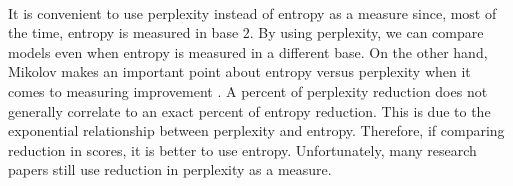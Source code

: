 \paragraph{}
It is convenient to use perplexity instead of entropy as a measure since, most of the time, entropy is measured in base $2$. By using perplexity, we can compare models even when entropy is measured in a different base. On the other hand, Mikolov makes an important point about entropy versus perplexity when it comes to measuring improvement \cite{Mikolov2012}. A percent of perplexity reduction does not generally correlate to an exact percent of entropy reduction. This is due to the exponential relationship between perplexity and entropy. Therefore, if comparing reduction in scores, it is better to use entropy. Unfortunately, many research papers still use reduction in perplexity as a measure.
